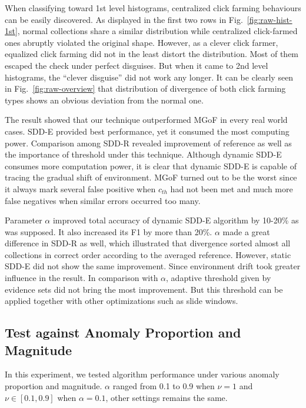\documentclass[10pt,conference,letterpaper]{article}
\begin{document}
			When classifying toward 1st level histograms, centralized click farming behaviours can be easily discovered. As displayed in the first two rows in Fig.~\ref{fig:raw-hist-1st}, normal collections share a similar distribution while centralized click-farmed ones abruptly violated the original shape. However, as a clever click farmer, equalized click farming did not in the least distort the distribution. Most of them escaped the check under perfect disguises.
			But when it came to 2nd level histograms, the ``clever disguise'' did not work any longer. It can be clearly seen in Fig.~\ref{fig:raw-overview} that distribution of divergence of both click farming types shows an obvious deviation from the normal one.
			
			The result showed that our technique outperformed MGoF in every real world cases.
			SDD-E provided best performance, yet it consumed the most computing power. Comparison among SDD-R revealed improvement of reference as well as the importance of threshold under this technique. Although dynamic SDD-E consumes more computation power, it is clear that dynamic SDD-E is capable of tracing the gradual shift of environment. MGoF turned out to be the worst since it always mark several false positive when $c_{th}$ had not been met and much more false negatives when similar errors occurred too many. 
			
			Parameter $\alpha$ improved total accuracy of dynamic SDD-E algorithm by 10-20\% as was supposed. It also increased its F1 by more than 20\%. $\alpha$ made a great difference in SDD-R as well, which illustrated that divergence sorted almost all collections in correct order according to the averaged reference. However, static SDD-E did not show the same improvement. Since environment drift took greater influence in the result. In comparison with $\alpha$, adaptive threshold given by evidence sets did not bring the most improvement. But this threshold can be applied together with other optimizations such as slide windows.
	
		\subsection{Test against Anomaly Proportion and Magnitude}\label{sec:exp-synthetic}
			In this experiment, we tested algorithm performance under various anomaly proportion and magnitude. $\alpha$ ranged from 0.1 to 0.9 when $\nu = 1$ and $\nu \in [0.1, 0.9]$ when $\alpha = 0.1$, other settings remains the same.
			
\end{document}
